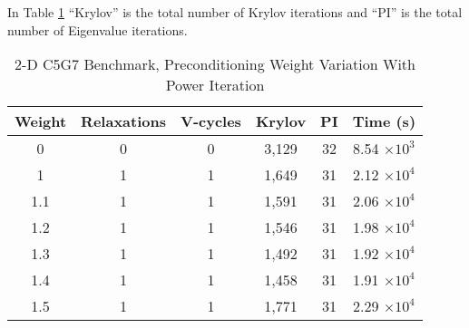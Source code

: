 In Table \ref{table:2-D c5g7} ``Krylov'' is the total number of Krylov iterations and ``PI'' is the total number of Eigenvalue iterations. 
%
\begin{table}[!h]
\caption{2-D C5G7 Benchmark, Preconditioning Weight Variation With Power Iteration}
\begin{center}
\begin{tabular}{c c c c c c}
\hline
Weight & Relaxations & V-cycles & Krylov & PI & Time (s) \\[0.5ex]
\hline
0    & 0 & 0 & 3,129 & 32 & 8.54 $\times 10^{3}$ \\
1    & 1 & 1 & 1,649 & 31 & 2.12 $\times 10^{4}$ \\
1.1 & 1 & 1 & 1,591 & 31 & 2.06 $\times 10^{4}$ \\
1.2 & 1 & 1 & 1,546 & 31 & 1.98 $\times 10^{4}$ \\
1.3 & 1 & 1 & 1,492 & 31 & 1.92 $\times 10^{4}$ \\
1.4 & 1 & 1 & 1,458 & 31 & 1.91 $\times 10^{4}$ \\
1.5 & 1 & 1 & 1,771 & 31 & 2.29 $\times 10^{4}$ \\
\hline 
\end{tabular} 
\end{center}
\label{table:2-D c5g7}
\end{table}

